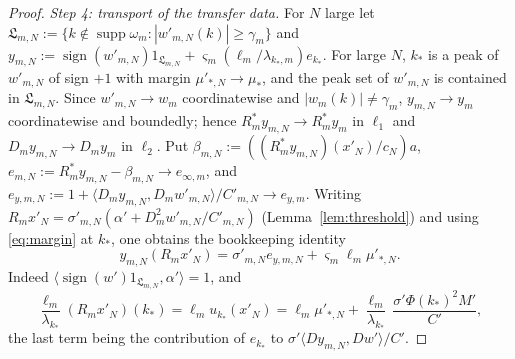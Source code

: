\documentclass[10pt]{amsart}
\theoremstyle{definition}
\theoremstyle{remark}
\newcommand{\supp}{\operatorname{supp}}
\newcommand{\sgn}{\operatorname{sign}}
\newcommand{\ip}[2]{\langle #1,#2\rangle}
\begin{document}
\begin{proof}
\emph{Step 4: transport of the transfer data.}  For $N$ large let
$\mathfrak L_{m,N}:=\{k\notin\supp\omega_m:|w'_{m,N}(k)|\ge\gamma_m\}$ and
$y_{m,N}:=\sgn(w'_{m,N})1_{\mathfrak L_{m,N}}+\varsigma_m(\ell_m/\lambda_{k_*,m})
e_{k_*}$.  For large $N$, $k_*$ is a peak of $w'_{m,N}$ of sign $+1$ with
margin $\mu'_{*,N}\to\mu_*$, and the peak set of $w'_{m,N}$ is contained
in $\mathfrak L_{m,N}$.  Since $w'_{m,N}\to w_m$ coordinatewise and
$|w_m(k)|\ne\gamma_m$, $y_{m,N}\to y_m$ coordinatewise and boundedly; hence
$R_m^*y_{m,N}\to R_m^*y_m$ in $\ell_1$ and $D_my_{m,N}\to D_my_m$ in
$\ell_2$.  Put $\beta_{m,N}:=((R_m^*y_{m,N})(x'_N)/c_N)a$,
$e_{m,N}:=R_m^*y_{m,N}-\beta_{m,N}\to e_{\infty,m}$, and
$e_{y,m,N}:=1+\ip{D_my_{m,N}}{D_mw'_{m,N}}/C'_{m,N}\to e_{y,m}$.  Writing
$R_mx'_N=\sigma'_{m,N}(\alpha'+D_m^2w'_{m,N}/C'_{m,N})$
(Lemma~\ref{lem:threshold}) and using \eqref{eq:margin} at $k_*$, one obtains
the bookkeeping identity
\begin{equation}\label{eq:bookkeeping}
 y_{m,N}(R_mx'_N)=\sigma'_{m,N}e_{y,m,N}+\varsigma_m\ell_m\mu'_{*,N}.
\end{equation}
Indeed $\ip{\sgn(w')1_{\mathfrak L_{m,N}}}{\alpha'}=1$, and
\[
 \frac{\ell_m}{\lambda_{k_*}}(R_mx'_N)(k_*)=\ell_mu_{k_*}(x'_N)=
 \ell_m\mu'_{*,N}+\frac{\ell_m}{\lambda_{k_*}}\,\frac{\sigma'\Phi(k_*)^2M'}{C'},
\]
the last term being the contribution of $e_{k_*}$ to
$\sigma'\ip{D y_{m,N}}{Dw'}/C'$.


\end{proof}
\end{document}
